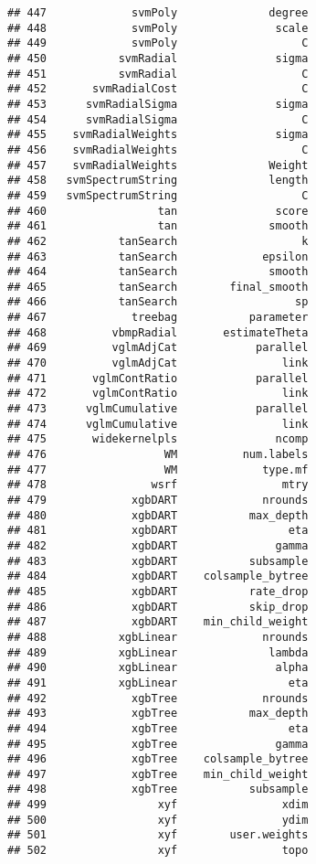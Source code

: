 \documentclass[
]{article}
\begin{document}
\begin{verbatim}
## 447             svmPoly              degree
## 448             svmPoly               scale
## 449             svmPoly                   C
## 450           svmRadial               sigma
## 451           svmRadial                   C
## 452       svmRadialCost                   C
## 453      svmRadialSigma               sigma
## 454      svmRadialSigma                   C
## 455    svmRadialWeights               sigma
## 456    svmRadialWeights                   C
## 457    svmRadialWeights              Weight
## 458   svmSpectrumString              length
## 459   svmSpectrumString                   C
## 460                 tan               score
## 461                 tan              smooth
## 462           tanSearch                   k
## 463           tanSearch             epsilon
## 464           tanSearch              smooth
## 465           tanSearch        final_smooth
## 466           tanSearch                  sp
## 467             treebag           parameter
## 468          vbmpRadial       estimateTheta
## 469          vglmAdjCat            parallel
## 470          vglmAdjCat                link
## 471       vglmContRatio            parallel
## 472       vglmContRatio                link
## 473      vglmCumulative            parallel
## 474      vglmCumulative                link
## 475       widekernelpls               ncomp
## 476                  WM          num.labels
## 477                  WM             type.mf
## 478                wsrf                mtry
## 479             xgbDART             nrounds
## 480             xgbDART           max_depth
## 481             xgbDART                 eta
## 482             xgbDART               gamma
## 483             xgbDART           subsample
## 484             xgbDART    colsample_bytree
## 485             xgbDART           rate_drop
## 486             xgbDART           skip_drop
## 487             xgbDART    min_child_weight
## 488           xgbLinear             nrounds
## 489           xgbLinear              lambda
## 490           xgbLinear               alpha
## 491           xgbLinear                 eta
## 492             xgbTree             nrounds
## 493             xgbTree           max_depth
## 494             xgbTree                 eta
## 495             xgbTree               gamma
## 496             xgbTree    colsample_bytree
## 497             xgbTree    min_child_weight
## 498             xgbTree           subsample
## 499                 xyf                xdim
## 500                 xyf                ydim
## 501                 xyf        user.weights
## 502                 xyf                topo

\end{verbatim}
\end{document}
